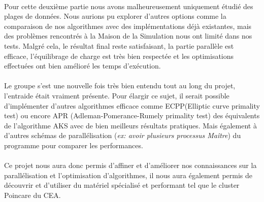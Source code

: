 	\paragraph{}Pour cette deuxième partie nous avons malheureusement uniquement étudié des plages de données. Nous aurions pu explorer d'autres options comme la comparaison de nos algorithmes avec des implémentations déjà existantes, mais des problèmes rencontrés à la Maison de la Simulation nous ont limité dans nos tests. Malgré cela, le résultat final reste satisfaisant, la partie parallèle est efficace, l'équilibrage de charge est très bien respectée et les optimisations effectuées ont bien amélioré les temps d’exécution.
	
	\paragraph{}Le groupe s'est une nouvelle fois très bien entendu tout au long du projet, l'entraide était vraiment présente. Pour élargir ce sujet, il serait possible d’implémenter d'autres algorithmes efficace comme ECPP(Elliptic curve primality test) ou encore APR (Adleman-Pomerance-Rumely primality test) des équivalents de l'algorithme AKS avec de bien meilleurs résultats pratiques. Mais également à d'autres schémas de parallélisation (\textit{ex: avoir plusieurs processus Maître}) du programme pour comparer les performances.
	
	\paragraph{}Ce projet nous aura donc permis d'affiner et d'améliorer nos connaissances sur la parallélisation et l'optimisation d'algorithmes, il nous aura également permis de découvrir et d'utiliser du matériel spécialisé et performant tel que le cluster Poincare du CEA. 




